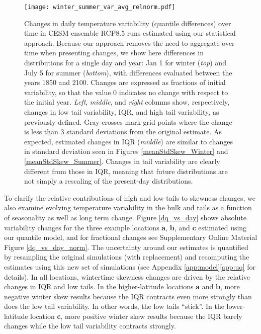 \documentclass{ametsoc}
\newcommand\bigfigwidth{\textwidth}
\begin{document}
\begin{figure*}[ht]
\centerline{\texttt{[image: winter\_summer\_var\_avg\_relnorm.pdf]}}
\caption{\small{Changes in daily temperature variability (quantile differences) over time in CESM ensemble RCP8.5 runs estimated using our statistical approach. Because our approach removes the need to aggregate over time when presenting changes, we show here differences in distributions for a single day and year: Jan 1 for winter (\emph{top}) and  July 5 for summer (\emph{bottom}), with differences evaluated between the years 1850 and 2100.  Changes are expressed as fractions of initial variability, so that the value 0 indicates no change with respect to the initial year.   \emph{Left}, \emph{middle}, and \emph{right} columns show, respectively, changes in low tail variability, IQR, and high tail variability, as previously defined.  Gray crosses mark grid points where the change is less than 3 standard deviations from the original estimate. As expected, estimated changes in IQR (\emph{middle}) are similar to changes in standard deviation seen in Figures \ref{meanStdSkew_Winter} and \ref{meanStdSkew_Summer}. Changes in tail variability are clearly different from those in IQR, meaning that future distributions are not simply a rescaling of the present-day distributions. 
 }}
\label{winter_summer_var_avg}
\end{figure*}

To clarify the relative contributions of high and low tails to skewness changes, we 
also examine evolving temperature variability in the bulk and tails as a function of seasonality as well as long term change. 
Figure \ref{dq_vs_day} shows absolute variability changes 
for the three example locations \textbf{a}, \textbf{b}, and \textbf{c}
estimated using our quantile model, and for fractional changes see Supplementary Online Material Figure \ref{dq_vs_day_norm}. The uncertainty around our estimates is quantified by resampling the original simulations (with replacement) and recomputing the estimates using this new set of simulations (see Appendix \ref{app:model}\ref{app:uq} for details). In all locations, wintertime skewness changes are driven by the relative changes in IQR and low tails. In the higher-latitude locations \textbf{a} and \textbf{b}, more negative winter skew results because the IQR contracts even more strongly than does the low tail variability. In other words, the low tails ``stick''.  In the lower-latitude location \textbf{c}, more positive winter skew results because the IQR barely changes while the low tail variability contracts strongly. 
\end{document}
